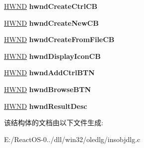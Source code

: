 \begin{DoxyCompactItemize}
\mbox{\label{struct_insert_object_dlg_info_a684b477d30955f904ca7a412f1aa4be9}} 
\hyperlink{interfacevoid}{H\+W\+ND} {\bfseries hwnd\+Create\+Ctrl\+CB}
\item 
\mbox{\label{struct_insert_object_dlg_info_a24979c3fdfa7d5585f299915ead9968a}} 
\hyperlink{interfacevoid}{H\+W\+ND} {\bfseries hwnd\+Create\+New\+CB}
\item 
\mbox{\label{struct_insert_object_dlg_info_a2ada3bedffe60c740f91b44912df34e3}} 
\hyperlink{interfacevoid}{H\+W\+ND} {\bfseries hwnd\+Create\+From\+File\+CB}
\item 
\mbox{\label{struct_insert_object_dlg_info_acda9b604fcde1714d8bd0a1f24773778}} 
\hyperlink{interfacevoid}{H\+W\+ND} {\bfseries hwnd\+Display\+Icon\+CB}
\item 
\mbox{\label{struct_insert_object_dlg_info_a6b1e61af54b2774334271f48a8351ba2}} 
\hyperlink{interfacevoid}{H\+W\+ND} {\bfseries hwnd\+Add\+Ctrl\+B\+TN}
\item 
\mbox{\label{struct_insert_object_dlg_info_af81a3b33d36b3b6d7ba86eb9ebb5832e}} 
\hyperlink{interfacevoid}{H\+W\+ND} {\bfseries hwnd\+Browse\+B\+TN}
\item 
\mbox{\label{struct_insert_object_dlg_info_a82734fd77dda1589f7f74f4e42325be1}} 
\hyperlink{interfacevoid}{H\+W\+ND} {\bfseries hwnd\+Result\+Desc}
\end{DoxyCompactItemize}


该结构体的文档由以下文件生成\+:\begin{DoxyCompactItemize}
\item 
E\+:/\+React\+O\+S-\/0../dll/win32/oledlg/insobjdlg.\+c\end{DoxyCompactItemize}
